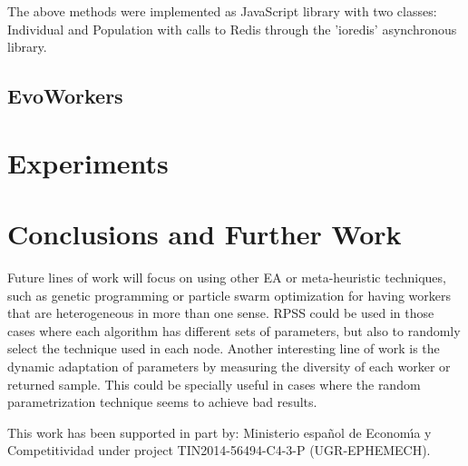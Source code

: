 The above methods were implemented as JavaScript library with two classes: Individual and Population with 
calls to Redis through the 'ioredis' asynchronous library.  



\subsection{EvoWorkers}
\label{sec:evoworkers}


\section{Experiments}
 \label{sec:experiments}



\section{Conclusions and Further Work}
\label{sec:conclusions}


Future lines of work will focus on using other EA or meta-heuristic techniques, 
such as genetic programming or particle swarm optimization for having 
workers that are heterogeneous in more than one sense. RPSS could be
used in those cases where each algorithm has different sets of
parameters, but also to randomly select the technique used in each
node. Another interesting line of work is the dynamic adaptation of
parameters by measuring the diversity of each worker or returned
sample. This could be specially useful in cases where the random
parametrization technique seems to achieve bad results. 

\begin{acks}
This work has been supported in part by:  Ministerio espa\~{n}ol de
Econom\'{\i}a y Competitividad under project TIN2014-56494-C4-3-P
(UGR-EPHEMECH).
\end{acks}
